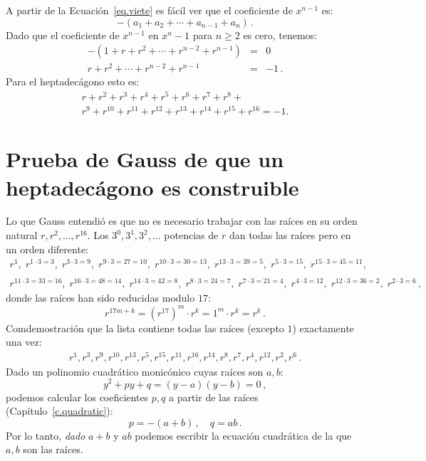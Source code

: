 A partir de la Ecuación~\ref{eq.viete} es fácil ver que el coeficiente de $x^{n-1}$ es:
\[
-(a_1+a_2+\cdots+a_{n-1}+a_n)\,.
\]
Dado que el coeficiente de $x^{n-1}$ en $x^n-1$ para $n\geq 2$ es cero, tenemos:
\begin{eqnarray*}
-(1+r+r^2+\cdots + r^{n-2}+r^{n-1})&=&0\\
r+r^2+\cdots + r^{n-2}+r^{n-1}&=&-1\,.
\end{eqnarray*}
Para el heptadecágono esto es:
\begin{multline}
r+r^2+r^3+r^4+r^5+r^6+r^7+r^8+\\
r^9+r^{10}+r^{11}+r^{12}+r^{13}+r^{14} + r^{15}+r^{16}=-1.\label{eq.minus-one}
\end{multline}

\section{Prueba de Gauss de que un heptadecágono es construible}\label{s.gauss}

Lo que Gauss entendió es que no es necesario trabajar con las raíces en su orden natural $r,r^2,\ldots,r^{16}$. Los $3^0, 3^1, 3^2, \ldots$ potencias de $r$ dan todas las raíces pero en un orden diferente:
\[
\begin{array}{l}
r^1, \;r^{1\cdot 3 =3},\; r^{3\cdot 3=9},\; r^{9\cdot 3=27=10},\; r^{10\cdot 3=30=13},\; r^{13\cdot 3=39=5},\; r^{5\cdot 3=15},\; r^{15\cdot 3=45=11},\\\\
r^{11\cdot 3 =33=16}, \;r^{16\cdot 3=48=14},\; r^{14\cdot 3=42=8},\; r^{8\cdot 3=24=7},\;r^{7\cdot 3=21=4},\; r^{4\cdot 3=12},\; r^{12\cdot 3=36=2},\; r^{2\cdot 3=6}\,,
\end{array}
\]
donde las raíces han sido reducidas modulo $17$:
\[
r^{17m+k}=(r^{17})^m\cdot r^k=1^m\cdot r^k=r^k\,.
\]
Comdemostración que la lista contiene todas las raíces (excepto $1$) exactamente una vez:
\begin{align}\label{eq.roots}
r^1, r^3, r^9, r^{10}, r^{13}, r^5, r^{15}, r^{11}, r^{16}, r^{14}, r^8, r^7, r^4, r^{12}, r^2, r^6\,.
\end{align}
Dado un polinomio cuadrático monicónico cuyas raíces son $a,b$:
\[
y^2+py+q=(y-a)(y-b)=0\,,
\]
podemos calcular los coeficientes $p,q$ a partir de las raíces (Capítulo~\ref{c.quadratic}):
\[
p=-(a+b)\,,\quad q=ab\,.
\]
Por lo tanto, \emph{dado} $a+b$ y $ab$ podemos escribir la ecuación cuadrática de la que $a,b$ son las raíces.

